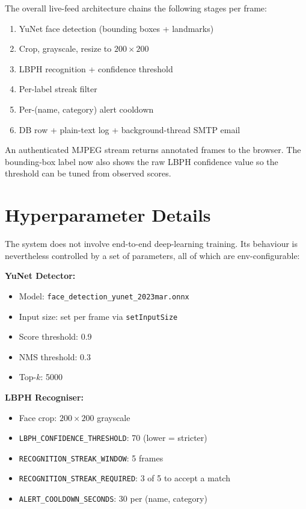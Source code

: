 \documentclass[11pt]{report}
\begin{document}
The overall live-feed architecture chains the following stages per frame:

\begin{enumerate}
    \item YuNet face detection (bounding boxes + landmarks)
    \item Crop, grayscale, resize to $200\times200$
    \item LBPH recognition + confidence threshold
    \item Per-label streak filter
    \item Per-(name, category) alert cooldown
    \item DB row + plain-text log + background-thread SMTP email
\end{enumerate}

An authenticated MJPEG stream returns annotated frames to the browser. The bounding-box label now also shows the raw LBPH confidence value so the threshold can be tuned from observed scores.

\section{Hyperparameter Details}

The system does not involve end-to-end deep-learning training. Its behaviour is nevertheless controlled by a set of parameters, all of which are env-configurable:

\textbf{YuNet Detector:}
\begin{itemize}
    \item Model: \texttt{face\_detection\_yunet\_2023mar.onnx}
    \item Input size: set per frame via \texttt{setInputSize}
    \item Score threshold: 0.9
    \item NMS threshold: 0.3
    \item Top-$k$: 5000
\end{itemize}

\textbf{LBPH Recogniser:}
\begin{itemize}
    \item Face crop: $200 \times 200$ grayscale
    \item \texttt{LBPH\_CONFIDENCE\_THRESHOLD}: 70 (lower = stricter)
    \item \texttt{RECOGNITION\_STREAK\_WINDOW}: 5 frames
    \item \texttt{RECOGNITION\_STREAK\_REQUIRED}: 3 of 5 to accept a match
    \item \texttt{ALERT\_COOLDOWN\_SECONDS}: 30 per (name, category)
\end{itemize}
\end{document}
